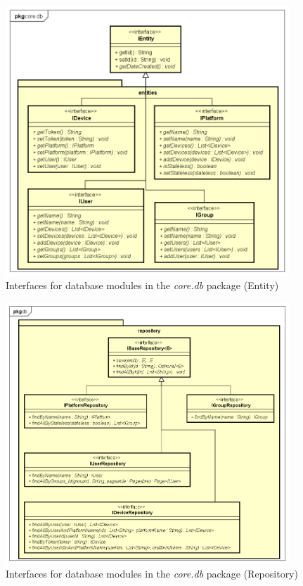 \begin{figure}[!ht]
	\centering
	\includegraphics[width=0.95\textwidth]{figures/03_design/core-db-module}
    \caption{Interfaces for database modules in the \textit{core.db} package (Entity)}
    \label{fig:core-db-module}
\end{figure}

\begin{figure}[!ht]
	\centering
	\includegraphics[width=0.95\textwidth]{figures/03_design/core-db-module-repo}
    \caption{Interfaces for database modules in the \textit{core.db} package (Repository)}
    \label{fig:core-db-module-repo}
\end{figure}

